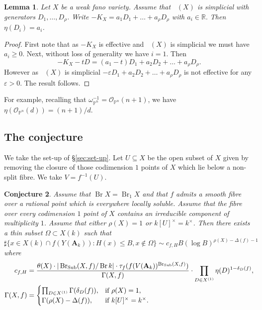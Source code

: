 \documentclass[a4paper,12pt,reqno]{amsart}
\numberwithin{equation}{section} \numberwithin{figure}{section}
\DeclareMathOperator{\Br}{Br} \DeclareMathOperator{\Brnr}{Br_{nr}}
\DeclareMathOperator{\Eff}{\Lambda_{eff} }
\renewcommand{\O}{\mathcal{O}}
\renewcommand\P{\mathbb{P}}
\newcommand\R{\mathbb{R}}
\newcommand{\Adele}{\mathbf{A}}
\renewcommand{\leq}{\leqslant}
\renewcommand{\geq}{\geqslant}
\renewcommand{\#}{\sharp}
\newtheorem{lemma}{Lemma}
\newtheorem{conjecture}[lemma]{Conjecture}
\theoremstyle{definition}
\numberwithin{lemma}{section}
\begin{document}
\begin{lemma} \label{lem:simplicial}
	Let $X$ be a weak fano variety. Assume that $\Eff(X)$
	is simplicial with generators $D_1,\dots,D_\rho$. Write 
	$-K_X= a_1 D_1 + \dots + a_\rho D_\rho$ with $a_i \in \R.$ Then $\eta(D_i) = a_i$.
\end{lemma}
\begin{proof}
	First note that as $-K_X$ is effective and $\Eff(X)$ is simplicial we must have $a_i \geq 0$.
	Next, without loss of generality we have $i = 1$. Then 
	$$-K_X - tD = (a_1 - t)D_1 + a_2 D_2 + \dots +a_\rho D_\rho.$$
	However as $\Eff(X)$ is simplicial $ -\varepsilon D_1 + a_2 D_2 + \dots + a_\rho D_\rho$
	is not effective for any $\varepsilon > 0$. The result follows.
\end{proof}

For example, recalling that $\omega_{\P^n}^{-1} = \O_{\P^n}(n + 1)$, we have $\eta(\O_{\P^n}(d)) = (n+1)/d$.

\subsection{The conjecture}
We take the set-up of  \S \ref{sec:set-up}. Let $U \subseteq X$ be the open subset of $X$ given by removing the closure of those codimension $1$ points of $X$ which lie below a non-split fibre. We take $V= f^{-1}(U)$. 


\begin{conjecture} \label{conj:main}
	Assume that $\Br X = \Br_1 X$ and that $f$ admits a smooth fibre over a rational
	point which is everywhere locally soluble. 
	Assume that the fibre over every codimension $1$ point of $X$
	contains an irreducible component of multiplicity $1$. 
	Assume that either $\rho(X) = 1$ or $k[U]^\times =k^\times$.
	Then there exists a thin subset $\Omega \subset X(k)$ such that
	$$\#\{ x \in X(k) \cap f(Y(\Adele_k)) : H(x) \leq B, x \notin \Omega \} 
	\sim c_{f,H}B(\log B)^{\rho(X)  - \Delta(f) - 1}$$
	where
	\begin{align*}
		c_{f,H} &= \frac{\theta(X) \cdot |\Sub(X,f)/\Br k| \cdot  \tau_f(f(V(\Adele_k))^{\Sub(X,f)})}
	{\Gamma(X,f)} \cdot  
	\prod_{D \in X^{(1)}}\eta(D)^{1- \delta_D(f)}, \\
	\Gamma(X,f) &= 
	\begin{cases}
		\prod_{D \in X^{(1)}}\Gamma(\delta_D(f)) , & \text{if } \rho(X) = 1, \\
		\Gamma( \rho(X) - \Delta(f)), & \text{if }k[U]^\times = k^\times.
	\end{cases}
	\end{align*}
\end{conjecture}
\end{document}

